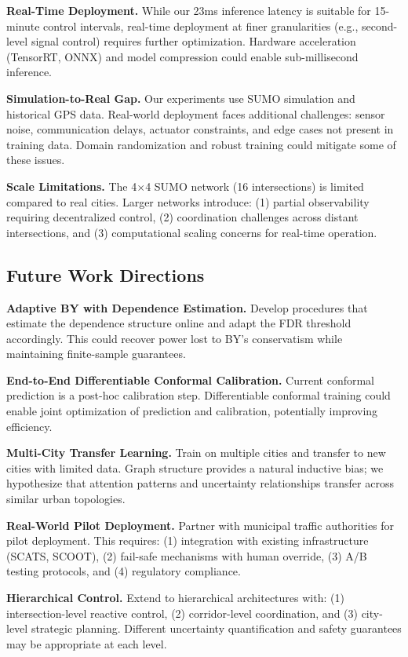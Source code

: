\documentclass{article}
\theoremstyle{plain}
\theoremstyle{definition}
\theoremstyle{remark}
\begin{document}
\textbf{Real-Time Deployment.} While our 23ms inference latency is suitable for 15-minute control intervals, real-time deployment at finer granularities (e.g., second-level signal control) requires further optimization. Hardware acceleration (TensorRT, ONNX) and model compression could enable sub-millisecond inference.

\textbf{Simulation-to-Real Gap.} Our experiments use SUMO simulation and historical GPS data. Real-world deployment faces additional challenges: sensor noise, communication delays, actuator constraints, and edge cases not present in training data. Domain randomization and robust training could mitigate some of these issues.

\textbf{Scale Limitations.} The 4$\times$4 SUMO network (16 intersections) is limited compared to real cities. Larger networks introduce: (1) partial observability requiring decentralized control, (2) coordination challenges across distant intersections, and (3) computational scaling concerns for real-time operation.

\subsection{Future Work Directions}

\textbf{Adaptive BY with Dependence Estimation.} Develop procedures that estimate the dependence structure online and adapt the FDR threshold accordingly. This could recover power lost to BY's conservatism while maintaining finite-sample guarantees.

\textbf{End-to-End Differentiable Conformal Calibration.} Current conformal prediction is a post-hoc calibration step. Differentiable conformal training could enable joint optimization of prediction and calibration, potentially improving efficiency.

\textbf{Multi-City Transfer Learning.} Train on multiple cities and transfer to new cities with limited data. Graph structure provides a natural inductive bias; we hypothesize that attention patterns and uncertainty relationships transfer across similar urban topologies.

\textbf{Real-World Pilot Deployment.} Partner with municipal traffic authorities for pilot deployment. This requires: (1) integration with existing infrastructure (SCATS, SCOOT), (2) fail-safe mechanisms with human override, (3) A/B testing protocols, and (4) regulatory compliance.

\textbf{Hierarchical Control.} Extend to hierarchical architectures with: (1) intersection-level reactive control, (2) corridor-level coordination, and (3) city-level strategic planning. Different uncertainty quantification and safety guarantees may be appropriate at each level.
\end{document}
